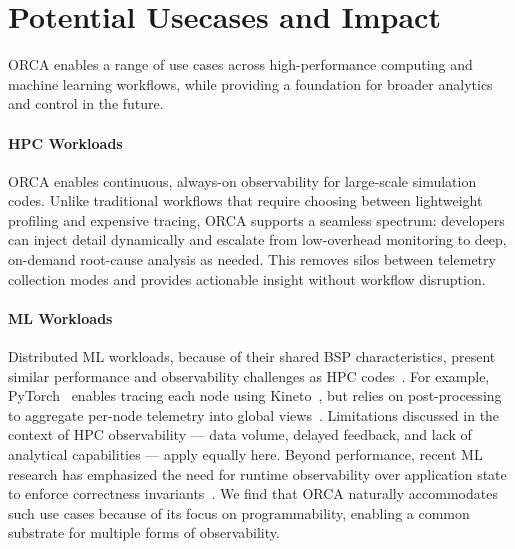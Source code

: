 \section{Potential Usecases and Impact}

ORCA enables a range of use cases across high-performance computing and machine learning workflows,
while providing a foundation for broader analytics and control in the future.

\paragraph{HPC Workloads}
ORCA enables continuous, always-on observability for large-scale simulation codes.
Unlike traditional workflows that require choosing between lightweight profiling and expensive
tracing, ORCA supports a seamless spectrum: developers can inject detail dynamically and escalate
from low-overhead monitoring to deep, on-demand root-cause analysis as needed.
This removes silos between telemetry collection modes and provides actionable insight without
workflow disruption.

\paragraph{ML Workloads}
Distributed ML workloads, because of their shared BSP characteristics, present similar performance
and observability challenges as HPC codes~\cite{Gangi2024:RDMA}.
For example, PyTorch~\cite{Paszk2019:PyTorch} enables tracing each node using
Kineto~\cite{2025:kineto}, but relies on post-processing to aggregate per-node telemetry into
global views~\cite{:HolisticTraceAnalysis}.
Limitations discussed in the context of HPC observability --- data volume, delayed feedback, and
lack of analytical capabilities --- apply equally here.
Beyond performance, recent ML research has emphasized the need for runtime observability over
application state to enforce correctness invariants~\cite{Jiang2025:TrainingwithConfidence}.
We find that ORCA naturally accommodates such use cases because of its focus on programmability,
enabling a common substrate for multiple forms of observability.

